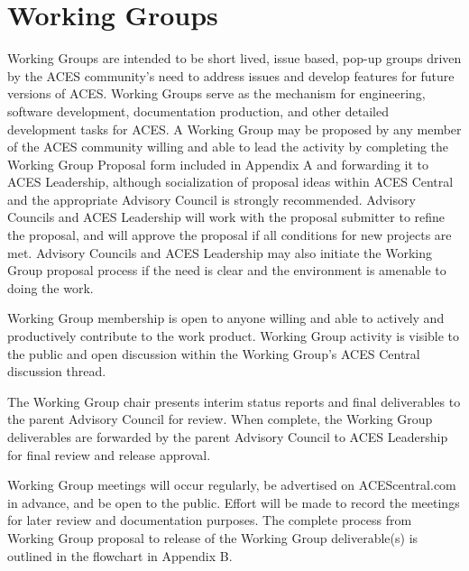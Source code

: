 \newpage
\section{Working Groups}
Working Groups are intended to be short lived, issue based, pop-up groups driven by the ACES community's need to address issues and develop features for future versions of ACES. Working Groups serve as the mechanism for engineering, software development, documentation production, and other detailed development tasks for ACES. A Working Group may be proposed by any member of the ACES community willing and able to lead the activity by completing the Working Group Proposal form included in Appendix A and forwarding it to ACES Leadership, although socialization of proposal ideas within ACES Central and the appropriate Advisory Council is strongly recommended. Advisory Councils and ACES Leadership will work with the proposal submitter to refine the proposal, and will approve the proposal if all conditions for new projects are met. Advisory Councils and ACES Leadership may also initiate the Working Group proposal process if the need is clear and the environment is amenable to doing the work.

Working Group membership is open to anyone willing and able to actively and productively contribute to the work product. Working Group activity is visible to the public and open discussion within the Working Group's ACES Central discussion thread.

The Working Group chair presents interim status reports and final deliverables to the parent Advisory Council for review. When complete, the Working Group deliverables are forwarded by the parent Advisory Council to ACES Leadership for final review and release approval.

Working Group meetings will occur regularly, be advertised on ACEScentral.com in advance, and be open to the public. Effort will be made to record the meetings for later review and documentation purposes.
The complete process from Working Group proposal to release of the Working Group deliverable(s) is outlined in the flowchart in Appendix B.